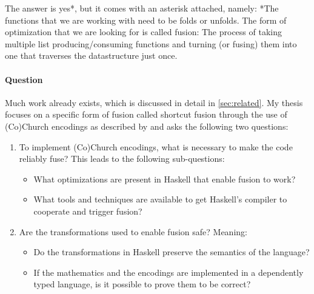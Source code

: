 The answer is yes*, but it comes with an asterisk attached, namely: *The functions that we are working with need to be folds or unfolds.
The form of optimization that we are looking for is called fusion:
The process of taking multiple list producing/consuming functions and turning (or fusing) them into one that traverses the datastructure just once.

\paragraph{Question}
Much work already exists, which is discussed in detail in \autoref{sec:related}.
My thesis focuses on a specific form of fusion called shortcut fusion through the use of (Co)Church encodings as described by \cite{Harper2011} and asks the following two questions:
\begin{enumerate}
  \item To implement (Co)Church encodings, what is necessary to make the code reliably fuse? This leads to the following sub-questions:
  \begin{itemize}
    \item What optimizations are present in Haskell that enable fusion to work?
    \item What tools and techniques are available to get Haskell's compiler to cooperate and trigger fusion?
  \end{itemize}
  \item Are the transformations used to enable fusion safe? Meaning:
  \begin{itemize}
    \item Do the transformations in Haskell preserve the semantics of the language?
    \item If the mathematics and the encodings are implemented in a dependently typed language, is it possible to prove them to be correct?
  \end{itemize}
\end{enumerate}

